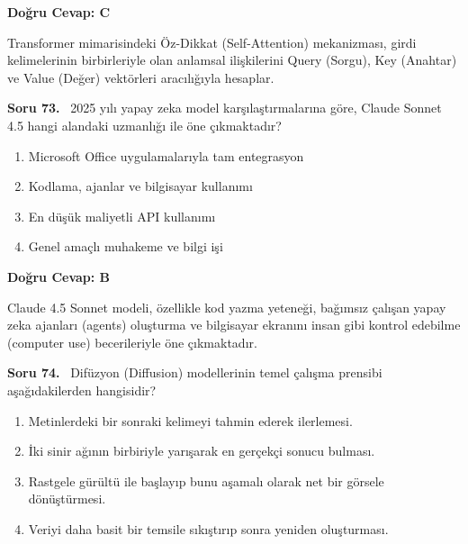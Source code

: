\documentclass[11pt,a4paper,openany]{book}
\begin{document}
\vspace{4pt}
\begin{tcolorbox}[title=Cevap ve Açıklama, colback=gray!3!white, colframe=primarycolor!90!black, arc=2mm, fonttitle=\bfseries\sffamily, top=6pt, bottom=6pt]
    \textbf{Doğru Cevap: C}

    \vspace{2pt}
    Transformer mimarisindeki Öz-Dikkat (Self-Attention) mekanizması, girdi kelimelerinin birbirleriyle olan anlamsal ilişkilerini Query (Sorgu), Key (Anahtar) ve Value (Değer) vektörleri aracılığıyla hesaplar.
\end{tcolorbox}
\vspace{10pt}
\needspace{5cm}
\vspace{8pt}
\noindent\textbf{\large\sffamily Soru 73.} \ 2025 yılı yapay zeka model karşılaştırmalarına göre, Claude Sonnet 4.5 hangi alandaki uzmanlığı ile öne çıkmaktadır?

\begin{enumerate}[label=\Alph*), leftmargin=25pt, topsep=4pt, itemsep=2pt]
        \item Microsoft Office uygulamalarıyla tam entegrasyon
        \item Kodlama, ajanlar ve bilgisayar kullanımı
        \item En düşük maliyetli API kullanımı
        \item Genel amaçlı muhakeme ve bilgi işi
\end{enumerate}

\vspace{4pt}
\begin{tcolorbox}[title=Cevap ve Açıklama, colback=gray!3!white, colframe=primarycolor!90!black, arc=2mm, fonttitle=\bfseries\sffamily, top=6pt, bottom=6pt]
    \textbf{Doğru Cevap: B}

    \vspace{2pt}
    Claude 4.5 Sonnet modeli, özellikle kod yazma yeteneği, bağımsız çalışan yapay zeka ajanları (agents) oluşturma ve bilgisayar ekranını insan gibi kontrol edebilme (computer use) becerileriyle öne çıkmaktadır.
\end{tcolorbox}
\vspace{10pt}
\needspace{5cm}
\vspace{8pt}
\noindent\textbf{\large\sffamily Soru 74.} \ Difüzyon (Diffusion) modellerinin temel çalışma prensibi aşağıdakilerden hangisidir?

\begin{enumerate}[label=\Alph*), leftmargin=25pt, topsep=4pt, itemsep=2pt]
        \item Metinlerdeki bir sonraki kelimeyi tahmin ederek ilerlemesi.
        \item İki sinir ağının birbiriyle yarışarak en gerçekçi sonucu bulması.
        \item Rastgele gürültü ile başlayıp bunu aşamalı olarak net bir görsele dönüştürmesi.
        \item Veriyi daha basit bir temsile sıkıştırıp sonra yeniden oluşturması.
\end{enumerate}
\end{document}
